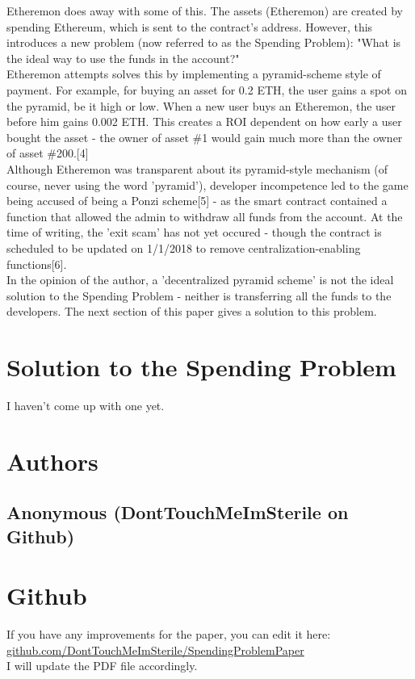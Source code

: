 \documentclass{article}
\begin{document}
Etheremon does away with some of this. The assets (Etheremon) are created by spending Ethereum, which is sent to the contract's address. However, this introduces a new problem (now referred to as the Spending Problem): "What is the ideal way to use the funds in the account?"
\\

Etheremon attempts solves this by implementing a pyramid-scheme style of payment. For example, for buying an asset for 0.2 ETH, the user gains a spot on the pyramid, be it high or low. When a new user buys an Etheremon, the user before him gains 0.002 ETH. This creates a ROI dependent on how early a user bought the asset - the owner of asset \#1 would gain much more than the owner of asset \#200.[4]
\\

Although Etheremon was transparent about its pyramid-style mechanism (of course, never using the word 'pyramid'), developer incompetence led to the game being accused of being a Ponzi scheme[5] - as the smart contract contained a function that allowed the admin to withdraw all funds from the account. At the time of writing, the 'exit scam' has not yet occured - though the contract is scheduled to be updated on 1/1/2018 to remove centralization-enabling functions[6]. 
\\

In the opinion of the author, a 'decentralized pyramid scheme' is not the ideal solution to the Spending Problem - neither is transferring all the funds to the developers. The next section of this paper gives a solution to this problem.
\\

\section{Solution to the Spending Problem}
I haven't come up with one yet. 
\newpage
\section{Authors}
\subsection{Anonymous (DontTouchMeImSterile on Github)}
\section{Github}
If you have any improvements for the paper, you can edit it here:\\                \url{github.com/DontTouchMeImSterile/SpendingProblemPaper}
\\
I will update the PDF file accordingly.
\end{document}
